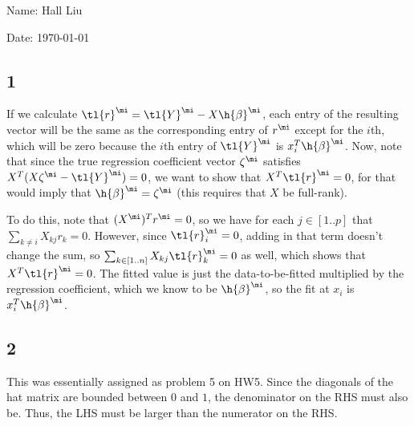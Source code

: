 \documentclass{article}
\begin{document}
Name: Hall Liu

Date: \today 
\vspace{1.5cm}
\subsection*{1}
If we calculate $\tl{r}^\mi=\tl{Y}^\mi-X\h{\beta}^\mi$, each entry of the resulting vector will be the same as the corresponding entry of $r^\mi$ except for the $i$th, which will be zero because the $i$th entry of $\tl{Y}^\mi$ is $x_i^T\h{\beta}^\mi$. Now, note that since the true regression coefficient vector $\zeta^\mi$ satisfies $X^T(X\zeta^\mi-\tl{Y}^\mi)=0$, we want to show that $X^T\tl{r}^\mi=0$, for that would imply that $\h{\beta}^\mi=\zeta^\mi$ (this requires that $X$ be full-rank). 

To do this, note that $(X^\mi)^Tr^\mi=0$, so we have for each $j\in[1..p]$ that $\sum_{k\neq i}X_{kj}r_k=0$. However, since $\tl{r}^\mi_i=0$, adding in that term doesn't change the sum, so $\sum_{k\in[1..n]}X_{kj}\tl{r}^\mi_k=0$ as well, which shows that $X^T\tl{r}^\mi=0$.
The fitted value is just the data-to-be-fitted multiplied by the regression coefficient, which we know to be $\h{\beta}^\mi$, so the fit at $x_i$ is $x_i^T\h{\beta}^\mi$.
\subsection*{2}
This was essentially assigned as problem 5 on HW5.
Since the diagonals of the hat matrix are bounded between $0$ and $1$, the denominator on the RHS must also be. Thus, the LHS must be larger than the numerator on the RHS.
\end{document}
